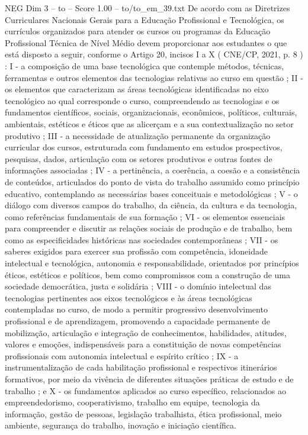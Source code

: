 \begin{textsample}{NEG Dim 3 – to – Score 1.00 – to/to\_em\_39.txt}
De acordo com as Diretrizes Curriculares Nacionais Gerais para a Educação Profissional e Tecnológica, os currículos organizados para atender os cursos ou programas da Educação Profissional Técnica de Nível Médio devem proporcionar aos estudantes o que está disposto a seguir, conforme o Artigo 20, incisos I a X ( CNE/CP, 2021, p. 8 ) : I - a composição de uma base tecnológica que contemple métodos, técnicas, ferramentas e outros elementos das tecnologias relativas ao curso em questão ; II - os elementos que caracterizam as áreas tecnológicas identificadas no eixo tecnológico ao qual corresponde o curso, compreendendo as tecnologias e os fundamentos científicos, sociais, organizacionais, econômicos, políticos, culturais, ambientais, estéticos e éticos que as alicerçam e a sua contextualização no setor produtivo ; III - a necessidade de atualização permanente da organização curricular dos cursos, estruturada com fundamento em estudos prospectivos, pesquisas, dados, articulação com os setores produtivos e outras fontes de informações associadas ; IV - a pertinência, a coerência, a coesão e a consistência de conteúdos, articulados do ponto de vista do trabalho assumido como princípio educativo, contemplando as necessárias bases conceituais e metodológicas ; V - o diálogo com diversos campos do trabalho, da ciência, da cultura e da tecnologia, como referências fundamentais de sua formação ; VI - os elementos essenciais para compreender e discutir as relações sociais de produção e de trabalho, bem como as especificidades históricas nas sociedades contemporâneas ; VII - os saberes exigidos para exercer sua profissão com competência, idoneidade intelectual e tecnológica, autonomia e responsabilidade, orientados por princípios éticos, estéticos e políticos, bem como compromissos com a construção de uma sociedade democrática, justa e solidária ; VIII - o domínio intelectual das tecnologias pertinentes aos eixos tecnológicos e às áreas tecnológicas contempladas no curso, de modo a permitir progressivo desenvolvimento profissional e de aprendizagem, promovendo a capacidade permanente de mobilização, articulação e integração de conhecimentos, habilidades, atitudes, valores e emoções, indispensáveis para a constituição de novas competências profissionais com autonomia intelectual e espírito crítico ; IX - a instrumentalização de cada habilitação profissional e respectivos itinerários formativos, por meio da vivência de diferentes situações práticas de estudo e de trabalho ; e X - os fundamentos aplicados ao curso específico, relacionados ao empreendedorismo, cooperativismo, trabalho em equipe, tecnologia da informação, gestão de pessoas, legislação trabalhista, ética profissional, meio ambiente, segurança do trabalho, inovação e iniciação científica.

\end{textsample}
